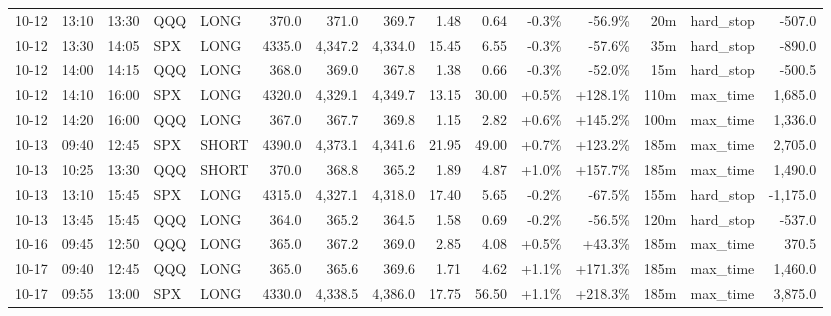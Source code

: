 \documentclass[11pt,a4paper,twoside]{article}
\begin{document}
\begin{landscape}
\begin{center}
\begin{longtable}{>{\color{txtmain}}l l l l l r r r r r r r r >{\color{txtmain}}l r}
10-12 & 13:10 & 13:30 & QQQ & LONG & 370.0 & 371.0 & 369.7 & 1.48 & 0.64 & \textcolor{lossred}{-0.3\%} & \textcolor{lossred}{-56.9\%} & 20m & hard\_stop & \textcolor{lossred}{-507.0} \\
10-12 & 13:30 & 14:05 & SPX & LONG & 4335.0 & 4,347.2 & 4,334.0 & 15.45 & 6.55 & \textcolor{lossred}{-0.3\%} & \textcolor{lossred}{-57.6\%} & 35m & hard\_stop & \textcolor{lossred}{-890.0} \\
10-12 & 14:00 & 14:15 & QQQ & LONG & 368.0 & 369.0 & 367.8 & 1.38 & 0.66 & \textcolor{lossred}{-0.3\%} & \textcolor{lossred}{-52.0\%} & 15m & hard\_stop & \textcolor{lossred}{-500.5} \\
10-12 & 14:10 & 16:00 & SPX & LONG & 4320.0 & 4,329.1 & 4,349.7 & 13.15 & 30.00 & \textcolor{wingreen}{+0.5\%} & \textcolor{wingreen}{+128.1\%} & 110m & max\_time & \textcolor{wingreen}{1,685.0} \\
10-12 & 14:20 & 16:00 & QQQ & LONG & 367.0 & 367.7 & 369.8 & 1.15 & 2.82 & \textcolor{wingreen}{+0.6\%} & \textcolor{wingreen}{+145.2\%} & 100m & max\_time & \textcolor{wingreen}{1,336.0} \\
10-13 & 09:40 & 12:45 & SPX & SHORT & 4390.0 & 4,373.1 & 4,341.6 & 21.95 & 49.00 & \textcolor{wingreen}{+0.7\%} & \textcolor{wingreen}{+123.2\%} & 185m & max\_time & \textcolor{wingreen}{2,705.0} \\
10-13 & 10:25 & 13:30 & QQQ & SHORT & 370.0 & 368.8 & 365.2 & 1.89 & 4.87 & \textcolor{wingreen}{+1.0\%} & \textcolor{wingreen}{+157.7\%} & 185m & max\_time & \textcolor{wingreen}{1,490.0} \\
10-13 & 13:10 & 15:45 & SPX & LONG & 4315.0 & 4,327.1 & 4,318.0 & 17.40 & 5.65 & \textcolor{lossred}{-0.2\%} & \textcolor{lossred}{-67.5\%} & 155m & hard\_stop & \textcolor{lossred}{-1,175.0} \\
10-13 & 13:45 & 15:45 & QQQ & LONG & 364.0 & 365.2 & 364.5 & 1.58 & 0.69 & \textcolor{lossred}{-0.2\%} & \textcolor{lossred}{-56.5\%} & 120m & hard\_stop & \textcolor{lossred}{-537.0} \\
10-16 & 09:45 & 12:50 & QQQ & LONG & 365.0 & 367.2 & 369.0 & 2.85 & 4.08 & \textcolor{wingreen}{+0.5\%} & \textcolor{wingreen}{+43.3\%} & 185m & max\_time & \textcolor{wingreen}{370.5} \\
10-17 & 09:40 & 12:45 & QQQ & LONG & 365.0 & 365.6 & 369.6 & 1.71 & 4.62 & \textcolor{wingreen}{+1.1\%} & \textcolor{wingreen}{+171.3\%} & 185m & max\_time & \textcolor{wingreen}{1,460.0} \\
10-17 & 09:55 & 13:00 & SPX & LONG & 4330.0 & 4,338.5 & 4,386.0 & 17.75 & 56.50 & \textcolor{wingreen}{+1.1\%} & \textcolor{wingreen}{+218.3\%} & 185m & max\_time & \textcolor{wingreen}{3,875.0} \\

\end{longtable}
\end{center}
\end{landscape}
\end{document}
